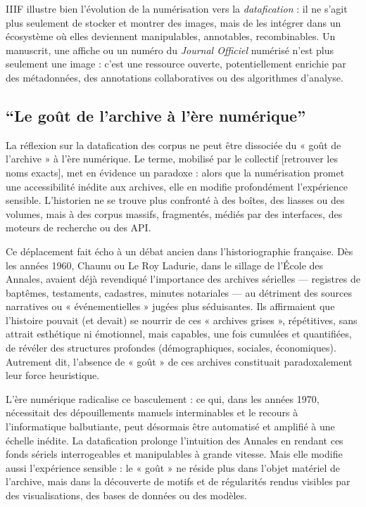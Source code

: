 IIIF illustre bien l’évolution de la numérisation vers la \emph{datafication} : il ne s’agit plus seulement de stocker et montrer des images, mais de les intégrer dans un écosystème où elles deviennent manipulables, annotables, recombinables. Un manuscrit, une affiche ou un numéro du \emph{Journal Officiel} numérisé n’est plus seulement une image : c’est une ressource ouverte, potentiellement enrichie par des métadonnées, des annotations collaboratives ou des algorithmes d’analyse.

\subsection{\enquote{Le goût de l'archive à l'ère numérique}}

La réflexion sur la datafication des corpus ne peut être dissociée du « goût de l’archive » à l’ère numérique. Le terme, mobilisé par le collectif [retrouver les noms exacts], met en évidence un paradoxe : alors que la numérisation promet une accessibilité inédite aux archives, elle en modifie profondément l’expérience sensible. L’historien ne se trouve plus confronté à des boîtes, des liasses ou des volumes, mais à des corpus massifs, fragmentés, médiés par des interfaces, des moteurs de recherche ou des API.

Ce déplacement fait écho à un débat ancien dans l’historiographie française. Dès les années 1960, Chaunu ou Le Roy Ladurie, dans le sillage de l’École des Annales, avaient déjà revendiqué l’importance des archives sérielles — registres de baptêmes, testaments, cadastres, minutes notariales — au détriment des sources narratives ou « événementielles » jugées plus séduisantes. Ils affirmaient que l’histoire pouvait (et devait) se nourrir de ces « archives grises », répétitives, sans attrait esthétique ni émotionnel, mais capables, une fois cumulées et quantifiées, de révéler des structures profondes (démographiques, sociales, économiques). Autrement dit, l’absence de « goût » de ces archives constituait paradoxalement leur force heuristique.

L’ère numérique radicalise ce basculement : ce qui, dans les années 1970, nécessitait des dépouillements manuels interminables et le recours à l’informatique balbutiante, peut désormais être automatisé et amplifié à une échelle inédite. La datafication prolonge l’intuition des Annales en rendant ces fonds sériels interrogeables et manipulables à grande vitesse. Mais elle modifie aussi l’expérience sensible : le « goût » ne réside plus dans l’objet matériel de l’archive, mais dans la découverte de motifs et de régularités rendus visibles par des visualisations, des bases de données ou des modèles.

